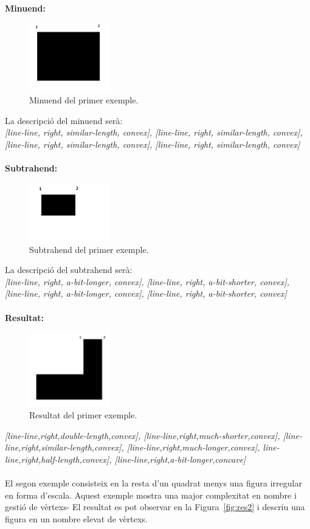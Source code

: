 \documentclass{article}
\begin{document}
{\bf Minuend:}
\begin{figure}[!h]
\centering
\includegraphics[width=100pt]{images/quad_gran.jpg}
\caption {Minuend del primer exemple.}
\label {fig:quad_gran1}
\end{figure}

La descripció del minuend serà:
\\
\emph {[line-line, right, similar-length, convex], [line-line, right, similar-length, convex], [line-line, right, similar-length, convex], [line-line, right, similar-length, convex]}
\\
\\

{\bf Subtrahend:}
\begin{figure}[!h]
\centering
\includegraphics[width=100pt]{images/quad_menut.jpg}
\caption {Subtrahend del primer exemple.}
\label {fig:quad_menut}
\end{figure}

La descripció del subtrahend serà:
\\
\emph {[line-line, right, a-bit-longer, convex], [line-line, right, a-bit-shorter, convex], [line-line, right, a-bit-longer, convex], [line-line, right, a-bit-shorter, convex]}
\\
\\
{\bf Resultat:}
\begin{figure}[!h]
\centering
\includegraphics[width=100pt]{images/res1.jpg}
\caption {Resultat del primer exemple.}
\label {fig:res1}
\end{figure}

\emph {[line-line,right,double-length,convex], [line-line,right,much-shorter,convex], [line-line,right,similar-length,convex], [line-line,right,much-longer,convex], line-line,right,half-length,convex], [line-line,right,a-bit-longer,concave]}
\\
\\
El segon exemple consisteix en la resta d'un quadrat menys una figura irregular en forma d'escala.
Aquest exemple mostra una major complexitat en nombre i gestió de vèrtexs-
El resultat es pot observar en la Figura~\ref{fig:res2} i descriu una figura en un nombre elevat de vèrtexs.
\\
\\
\end{document}
